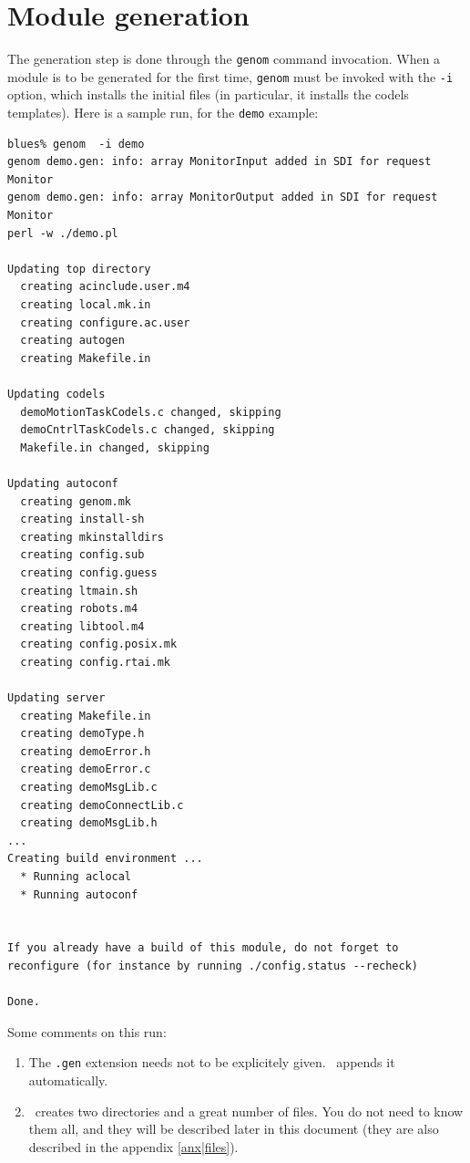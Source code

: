 \section{Module generation}
\label{sec|session|generate}

The  generation step is done  through the {\tt genom} command invocation.
When a module is to be generated for the  first time, {\tt genom} must be
invoked  with the {\tt  -i} option, which installs  the initial files (in
particular, it installs the codels templates).  Here is a sample run, for
the {\tt demo} example:

\begin{center}
\begin{cartouche}\small
\begin{verbatim}
blues% genom  -i demo
genom demo.gen: info: array MonitorInput added in SDI for request Monitor
genom demo.gen: info: array MonitorOutput added in SDI for request Monitor
perl -w ./demo.pl

Updating top directory
  creating acinclude.user.m4
  creating local.mk.in
  creating configure.ac.user
  creating autogen
  creating Makefile.in

Updating codels
  demoMotionTaskCodels.c changed, skipping
  demoCntrlTaskCodels.c changed, skipping
  Makefile.in changed, skipping

Updating autoconf
  creating genom.mk
  creating install-sh
  creating mkinstalldirs
  creating config.sub
  creating config.guess
  creating ltmain.sh
  creating robots.m4
  creating libtool.m4
  creating config.posix.mk
  creating config.rtai.mk

Updating server
  creating Makefile.in
  creating demoType.h
  creating demoError.h
  creating demoError.c
  creating demoMsgLib.c
  creating demoConnectLib.c
  creating demoMsgLib.h
...
Creating build environment ...
  * Running aclocal
  * Running autoconf


If you already have a build of this module, do not forget to
reconfigure (for instance by running ./config.status --recheck)

Done.

\end{verbatim}
\end{cartouche}
\end{center}

\bigbreak

Some comments on this run:

\begin{enumerate}
   \item  The {\tt   .gen}  extension   needs   not  to be    explicitely
   given. \GenoM\ appends it automatically.

   \item \GenoM\ creates two directories and a great number of files. You
   do not need to know them all, and they will be described later in this
   document (they are also described in the appendix \ref{anx|files}).
\end{enumerate}

